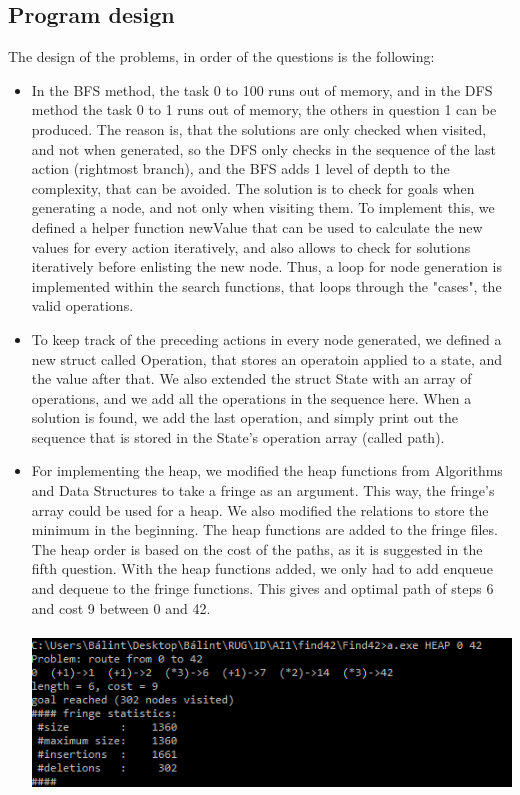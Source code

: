 \documentclass{article}
\begin{document}
\subsection*{Program design}
The design of the problems, in order of the questions is the following:
\begin{itemize}  
	\item In the BFS method, the task 0 to 100 runs out of memory, and in the DFS method the task 0 to 1 runs out of memory, the others in question 1 can be produced. The reason is, that the solutions are only checked when visited, and not when generated, so the DFS only checks in the sequence of the last action (rightmost branch), and the BFS adds 1 level of depth to the complexity, that can be avoided. The solution is to check for goals when generating a node, and not only when visiting them. To implement this, we defined a helper function newValue that can be used to calculate the new values for every action iteratively, and also allows to check for solutions iteratively before enlisting the new node. Thus, a loop for node generation is implemented within the search functions, that loops through the "cases", the valid operations.
	\item To keep track of the preceding actions in every node generated, we defined a new struct called Operation, that stores an operatoin applied to a state, and the value after that. We also extended the struct State with an array of operations, and we add all the operations in the sequence here. When a solution is found, we add the last operation, and simply print out the sequence that is stored in the State's operation array (called path).
	\item For implementing the heap, we modified the heap functions from Algorithms and Data Structures to take a fringe as an argument. This way, the fringe's array could be used for a heap. We also modified the relations to store the minimum in the beginning. The heap functions are added to the fringe files. The heap order is based on the cost of the paths, as it is suggested in the fifth question. With the heap functions added, we only had to add enqueue and dequeue to the fringe functions. This gives and optimal path of steps 6 and cost 9 between 0 and 42.
	\\
	\\
	\includegraphics{optimalpath.png}

\end{itemize}
\end{document}
